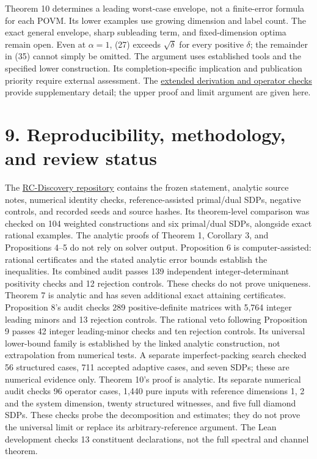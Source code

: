 \documentclass[
  11pt,
  a4paper,
]{article}
\begin{document}
Theorem 10 determines a leading worst-case envelope, not a finite-error
formula for each POVM. Its lower examples use growing dimension and
label count. The exact general envelope, sharp subleading term, and
fixed-dimension optima remain open. Even at \(\alpha=1\), (27) exceeds
\(\sqrt\delta\) for every positive \(\delta\); the remainder in (35)
cannot simply be omitted. The argument uses established tools and the
specified lower construction. Its completion-specific implication and
publication priority require external assessment. The
\href{https://github.com/christophergardner-star/RC-Discovery/blob/ccb4b5b22892a21de32c2a045102b85d640ea664/theory/joint_small_error_asymptotics.md}{extended
derivation and operator checks} provide supplementary detail; the upper
proof and limit argument are given here.

\section{9. Reproducibility, methodology, and review
status}\label{reproducibility-methodology-and-review-status}

The
\href{https://github.com/christophergardner-star/RC-Discovery}{RC-Discovery
repository} contains the frozen statement, analytic source notes,
numerical identity checks, reference-assisted primal/dual SDPs, negative
controls, and recorded seeds and source hashes. Its theorem-level
comparison was checked on 104 weighted constructions and six primal/dual
SDPs, alongside exact rational examples. The analytic proofs of Theorem
1, Corollary 3, and Propositions 4--5 do not rely on solver output.
Proposition 6 is computer-assisted: rational certificates and the stated
analytic error bounds establish the inequalities. Its combined audit
passes 139 independent integer-determinant positivity checks and 12
rejection controls. These checks do not prove uniqueness. Theorem 7 is
analytic and has seven additional exact attaining certificates.
Proposition 8's audit checks 289 positive-definite matrices with 5,764
integer leading minors and 13 rejection controls. The rational veto
following Proposition 9 passes 42 integer leading-minor checks and ten
rejection controls. Its universal lower-bound family is established by
the linked analytic construction, not extrapolation from numerical
tests. A separate imperfect-packing search checked 56 structured cases,
711 accepted adaptive cases, and seven SDPs; these are numerical
evidence only. Theorem 10's proof is analytic. Its separate numerical
audit checks 96 operator cases, 1,440 pure inputs with reference
dimensions 1, 2 and the system dimension, twenty structured witnesses,
and five full diamond SDPs. These checks probe the decomposition and
estimates; they do not prove the universal limit or replace its
arbitrary-reference argument. The Lean development checks 13 constituent
declarations, not the full spectral and channel theorem.
\end{document}
